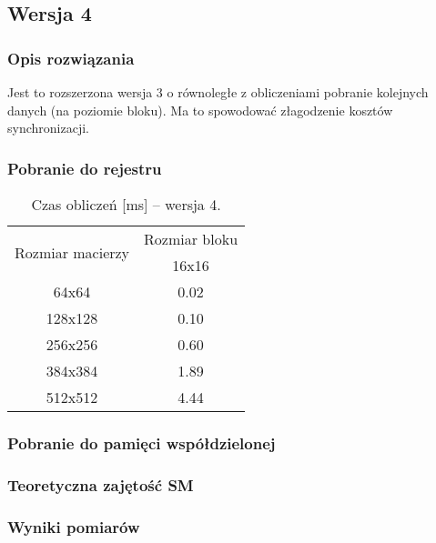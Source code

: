 
\subsection{Wersja 4}

\subsubsection{Opis rozwiązania}

Jest to rozszerzona wersja 3 o równoległe z obliczeniami pobranie kolejnych danych (na poziomie bloku). Ma to spowodować złagodzenie kosztów synchronizacji.

\subsubsection{Pobranie do rejestru}



\begin{table}[H]
\centering
\begin{tabular}{|c|c|}
\hline
\multirow{2}{*}{Rozmiar macierzy} & \multicolumn{1}{c|}{Rozmiar bloku} \\ \cline{2-2}
& 16x16 \\ \hline
64x64 & 0.02 \\ \hline
128x128 & 0.10 \\ \hline
256x256 & 0.60 \\ \hline
384x384 & 1.89 \\ \hline
512x512 & 4.44 \\ \hline
\end{tabular}
\caption{Czas obliczeń [ms] -- wersja 4.}
\end{table}

\subsubsection{Pobranie do pamięci współdzielonej}



\subsubsection{Teoretyczna zajętość SM}

\subsubsection{Wyniki pomiarów}

